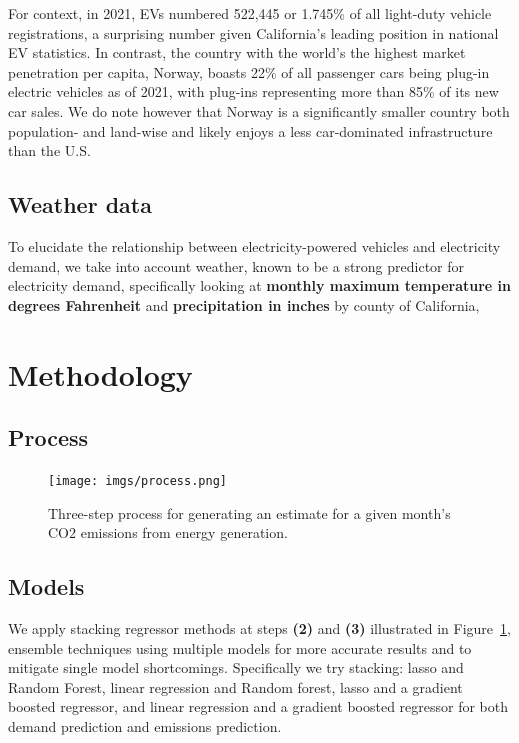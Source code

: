 \documentclass{article}
\begin{document}
For context, in 2021, EVs numbered 522,445 or 1.745\% of all light-duty vehicle registrations, a surprising number given California's leading position in national EV statistics. In contrast, the country with the world's the highest market penetration per capita, Norway, boasts 22\% of all passenger cars being plug-in electric vehicles as of 2021, with plug-ins representing more than 85\% of its new car sales. \citep{norwayevs} We do note however that Norway is a significantly smaller country both population- and land-wise and likely enjoys a less car-dominated infrastructure than the U.S.


\subsection{Weather data}
To elucidate the relationship between electricity-powered vehicles and electricity demand, we take into account weather, known to be a strong predictor for electricity demand, \citep{taylor:weather,hor:weather} specifically looking at \textbf{monthly maximum temperature in degrees Fahrenheit} and \textbf{precipitation in inches} by county of California, \citep{ncei:weatherdata} 

\section{Methodology}

\subsection{Process}

\begin{figure}[H]
\texttt{[image: imgs/process.png]}
\caption{\label{processfig} Three-step process for generating an estimate for a given month's CO\(2\) emissions from energy generation.}
\end{figure}

\subsection{Models}

We apply stacking regressor methods at steps \textbf{(2)} and \textbf{(3)} illustrated in Figure~\ref{processfig}, ensemble techniques using multiple models for more accurate results and to mitigate single model shortcomings. Specifically  we try stacking: lasso and Random Forest, linear regression and Random forest, lasso and a gradient boosted regressor, and linear regression and a gradient boosted regressor for both demand prediction and emissions prediction.
\end{document}
